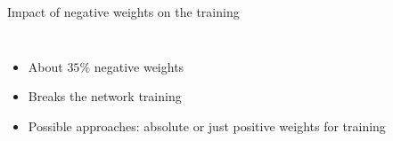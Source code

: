 \begin{frame}{Impact of negative weights on the training}
\begin{columns}
\begin{column}{0.5\textwidth}
\begin{figure}
            \end{figure}
        \end{column}
    \end{columns}
    \begin{itemize}
        \item About $35 \%$ negative weights
        \item Breaks the network training
        \item Possible approaches: absolute or just positive weights for training
    \end{itemize}
\end{frame}